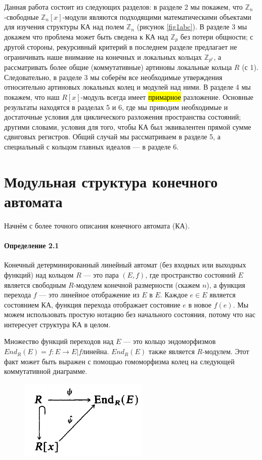 \documentclass[a4paper,12pt]{article}
\begin{document}
Данная работа состоит из следующих разделов: в разделе 2 мы покажем, что $\mathbb{Z}_{n}$-свободные $\mathbb{Z}_{n}[x]$-модули являются подходящими математическими объектами для изучения структуры КА над полем $\mathbb{Z}_{n}$ (рисунок \ref{fig1abc}). В разделе 3 мы докажем что проблема может быть сведена к КА над $\mathbb{Z}_{p}$ без потери общности; с другой стороны, рекурсивный критерий в последнем разделе предлагает не ограничивать наше внимание на конечных и локальных кольцах $\mathbb{Z}_{p^r}$, а рассматривать более общие (коммутативные) артиновы локальные кольца $R$ (с 1). Следовательно, в разделе 3 мы соберём все необходимые утверждения относительно артиновых локальных колец и модулей над ними. В разделе 4 мы покажем, что наш $R[x]$-модуль всегда имеет \hl{примарное} разложение. Основные результаты находятся в разделах 5 и 6, где мы приводим необходимые и достаточные условия для циклического разложения пространства состояний; другими словами, условия для того, чтобы КА был эквивалентен прямой сумме сдвиговых регистров. Общий случай мы рассматриваем в разделе 5, а специальный с кольцом главных идеалов --- в разделе 6.


\section{Модульная структура конечного автомата}

Начнём с более точного описания конечного автомата (КА).

\paragraph{Определение 2.1}

Конечный детерминированный линейный автомат (без входных или выходных функций) над кольцом $R$ --- это пара $(E,f)$, где пространство состояний $E$ является свободным $R$-модулем конечной размерности (скажем $n$), а функция перехода $f$ --- это линейное отображение из $E$ в $E$. Каждое $e \in E$ является состоянием КА, функция перехода отображает состояние $e$ в новое $f(e)$. Мы можем использовать простую нотацию без начального состояния, потому что нас интересует структура КА в целом.

Множество функций переходов над $E$ --- это кольцо эндоморфизмов $End_R(E) = {f : E \rightarrow E | f линейна}$. $End_R(E)$ также является $R$-модулем. Этот факт может быть выражен с помощью гомоморфизма колец на следующей коммутативной диаграмме.

\begin{figure}[h]
	\centering
	\includegraphics[width=0.25\linewidth]{pictures/diag_1.png}
\end{figure}
\end{document}
